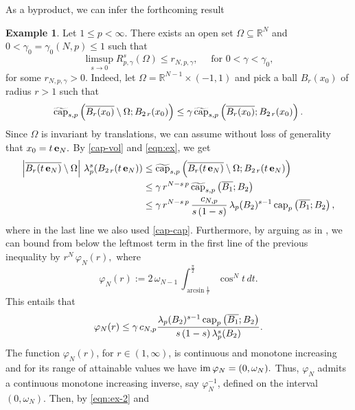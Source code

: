 \documentclass{amsart}
\theoremstyle{definition}
\newtheorem{example}[theorem]{Example}
\numberwithin{equation}{section}
\begin{document}
As a byproduct, we can infer the forthcoming result 
\begin{example}\label{ex:finiteness-inr}
	Let $1 \le p < \infty$. There exists an open set $\Omega \subseteq \mathbb{R}^N$ and $0 < \gamma_0 = \gamma_0\left(N,p\right) \le 1$ such that 
	\begin{equation} \label{eqn:ex-tesi}
		\limsup_{s \to 0} R^s_{p, \gamma}(\Omega) \le r_{N, p, \gamma}, \quad \mbox{ for } 0 < \gamma < \gamma_0,
	\end{equation}
	for some $r_{N, p, \gamma} > 0$. Indeed, let $\Omega = \mathbb{R}^{N-1} \times (-1,1)$ and pick a ball $B_r(x_0)$ of radius $r > 1$ such that
	\begin{equation} \label{eqn:ex}
		\widetilde{{\rm cap}}_{s,p}\left(\overline{B_r(x_0)} \setminus \Omega; B_{2\,r}(x_0)\right) \le \gamma\,\widetilde{{\rm cap}}_{s,p}\left(\overline{B_r(x_0)}; B_{2\,r}(x_0)\right). 
	\end{equation} 
	Since $\Omega$ is invariant by translations, we can assume without loss of generality that $x_0 = t\,{\bf e}_N.$ By \eqref{cap-vol} and \eqref{eqn:ex}, we get 
	\begin{equation}
		\begin{split}
		\left|\overline{B_{r}(t\,{\bf e}_N)}\setminus \Omega\right|\,\lambda^s_p(B_{2\,r}(t\,{\bf e}_N)) &\le \widetilde{{\rm cap}}_{s,p}\left(\overline{B_r(t\,{\bf e}_N)} \setminus \Omega; B_{2\,r}(t\,{\bf e}_N)\right) \\
		&\le \gamma\,r^{N-s\,p}\,\widetilde{{\rm cap}}_{s,p} \left(\overline{B_1}; B_2\right)
		\\
		&\le \gamma\,r^{N-s\,p}\,\frac{c_{N, p}}{s\,(1-s)}\,\lambda_{p}(B_2)^{s-1}\,{\rm cap}_p\left(\overline{B_1}; B_2\right),
	\end{split}
	\end{equation}
	where in the last line we also used \eqref{cap-cap}. 
	Furthermore, by arguing as in \cite[Example A.2]{BozBra2}, we can bound from below the leftmost term in the first line of the previous inequality by $r^{N}\,\varphi_N(r),$ where
	\[
 \varphi_N(r) := 2\,\omega_{N-1}\,\int_{\arcsin \frac{1}{r}}^{\frac{\pi}{2}} \cos^N t\,dt.
	\] 
	This entails that 
	\begin{equation} \label{eqn:ex-2}
		\varphi_N(r) \le \gamma\,c_{N,p}\frac{\lambda_{p}(B_2)^{s-1}\,{\rm cap}_p\left(\overline{B_1}; B_2\right)}{s\,(1-s)\,\lambda_{p}^s(B_2)}. 
	\end{equation}
	The function $\varphi_N(r)$, for $r \in (1, \infty)$, is continuous and monotone increasing and for its range of attainable values we have  ${\rm im}\,\varphi_N = (0, \omega_N).$ Thus, $\varphi_N$ admits a continuous monotone increasing inverse, say $\varphi_N^{-1}$, defined on the interval $(0, \omega_N)$. Then, by \eqref{eqn:ex-2} and

\end{example}
\end{document}
